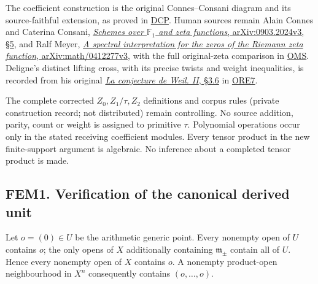 The coefficient construction is the original Connes--Consani diagram and
its source-faithful extension, as proved in
\href{https://github.com/KokunoYumeto/zeta-function-research-reader/blob/36a82ecca98addb8a98b48204e349737856c7223/workbenches/splitzero-tandem/continuations/20260924-cohomology-weight-and-character-lifts/original-character-lifting/tau_lifting_weights_20260924/SOURCE_CC_DOUBLE_PULLBACK.md}{DCP}.
Human sources remain Alain Connes and Caterina Consani,
\href{https://arxiv.org/abs/0903.2024v3}{\emph{Schemes over
\(\mathbb F_1\) and zeta functions}, arXiv:0903.2024v3, §5}, and Ralf
Meyer, \href{https://arxiv.org/abs/math/0412277v3}{\emph{A spectral
interpretation for the zeros of the Riemann zeta function},
arXiv:math/0412277v3}, with the full original-zeta comparison in
\href{https://github.com/KokunoYumeto/zeta-function-research-reader/blob/36a82ecca98addb8a98b48204e349737856c7223/workbenches/splitzero-tandem/continuations/20260924-cohomology-weight-and-character-lifts/original-character-lifting/tau_lifting_weights_20260924/ORIGINAL_MELLIN_SPECTRAL_SYNTHESIS.md}{OMS}.
Deligne's distinct lifting cross, with its precise twists and weight
inequalities, is recorded from his original
\href{https://www.numdam.org/item/PMIHES_1980__52__137_0/}{\emph{La
conjecture de Weil. II}, §3.6} in
\href{https://github.com/KokunoYumeto/zeta-function-research-reader/blob/36a82ecca98addb8a98b48204e349737856c7223/workbenches/splitzero-tandem/continuations/20260924-cohomology-weight-and-character-lifts/original-character-lifting/tau_lifting_weights_20260924/ORIGINAL_RESTRICTION_EXTENSION_AND_DELIGNE_CROSS.md}{ORE7}.

The complete corrected \(Z_0,Z_1/\tau,Z_2\) definitions and corpus rules
(private construction record; not distributed) remain controlling. No
source addition, parity, count or weight is assigned to primitive
\(\tau\). Polynomial operations occur only in the stated receiving
coefficient modules. Every tensor product in the new finite-support
argument is algebraic. No inference about a completed tensor product is
made.

\subsection{FEM1. Verification of the canonical derived
unit}\label{fem1.-verification-of-the-canonical-derived-unit}

Let \(o=(0)\in U\) be the arithmetic generic point. Every nonempty open
of \(U\) contains \(o\); the only opens of \(X\) additionally containing
\(\mathfrak m_\pm\) contain all of \(U\). Hence every nonempty open of
\(X\) contains \(o\). A nonempty product-open neighbourhood in \(X^n\)
consequently contains \((o,\ldots,o)\).

